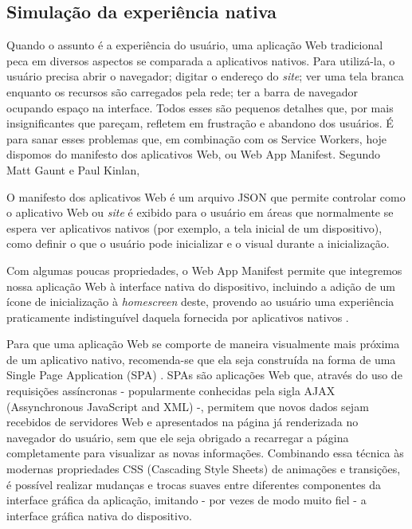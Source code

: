 \documentclass[
	article,			%
	11pt,				%
	oneside,			%
	a4paper,			%
	english,			%
	brazil,				%
	sumario=tradicional
	]{abntex2}
\begin{document}
\subsection{Simulação da experiência nativa}

Quando o assunto é a experiência do usuário, uma aplicação Web tradicional peca em diversos aspectos se comparada a aplicativos nativos. Para utilizá-la, o usuário precisa abrir o navegador; digitar o endereço do \textit{site}; ver uma tela branca enquanto os recursos são carregados pela rede; ter a barra de navegador ocupando espaço na interface. Todos esses são pequenos detalhes que, por mais insignificantes que pareçam, refletem em frustração e abandono dos usuários. É para sanar esses problemas que, em combinação com os Service Workers, hoje dispomos do manifesto dos aplicativos Web, ou Web App Manifest. Segundo Matt Gaunt e Paul Kinlan,

\begin{citacao}
	O manifesto dos aplicativos Web é um arquivo JSON que permite controlar como o aplicativo Web ou \textit{site} é exibido para o usuário em áreas que normalmente se espera ver aplicativos nativos (por exemplo, a tela inicial de um dispositivo), como definir o que o usuário pode inicializar e o visual durante a inicialização. \cite{gaunt-kinlan-2017}
\end{citacao}

Com algumas poucas propriedades, o Web App Manifest permite que integremos nossa aplicação Web à interface nativa do dispositivo, incluindo a adição de um ícone de inicialização à \textit{homescreen} deste, provendo ao usuário uma experiência praticamente indistinguível daquela fornecida por aplicativos nativos \cite{lopes-2016}.

Para que uma aplicação Web se comporte de maneira visualmente mais próxima de um aplicativo nativo, recomenda-se que ela seja construída na forma de uma Single Page Application (SPA) \cite{lopes-2016}. SPAs são aplicações Web que, através do uso de requisições assíncronas - popularmente conhecidas pela sigla AJAX (Assynchronous JavaScript and XML) -, permitem que novos dados sejam recebidos de servidores Web e apresentados na página já renderizada no navegador do usuário, sem que ele seja obrigado a recarregar a página completamente para visualizar as novas informações. Combinando essa técnica às modernas propriedades CSS (Cascading Style Sheets) de animações e transições, é possível realizar mudanças e trocas suaves entre diferentes componentes da interface gráfica da aplicação, imitando - por vezes de modo muito fiel - a interface gráfica nativa do dispositivo.
\end{document}
